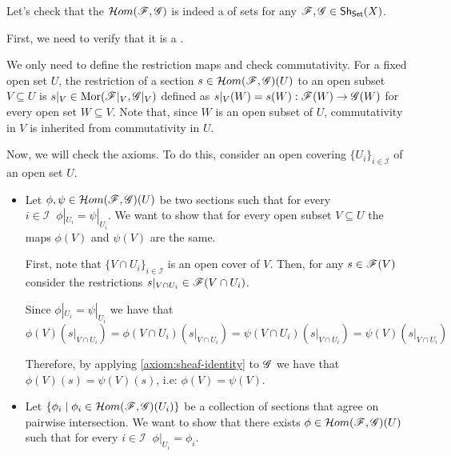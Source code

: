 \documentclass[../main.tex]{subfiles}
\begin{document}
\begin{remark}
  Let's check that the  \(\mathcal{H}om(\mathscr{F}, \mathscr{G})\) is indeed a  of sets for any \(\mathscr{F}, \mathscr{G} \in \mathsf{Sh}_{\mathsf{Set}}(X)\).

  First, we need to verify that it is a .

  We only need to define the restriction maps and check commutativity.
  For a fixed open set \(U\), the restriction of a section \(s \in \mathcal{H}om(\mathscr{F}, \mathscr{G})(U)\) to an open subset \(V \subseteq U\) is \(s|_{V} \in \operatorname{Mor}(\mathscr{F}|_{V}, \mathscr{G}|_{V})\) defined as \(s|_{V}(W) = s(W): \mathscr{F}(W) \to \mathscr{G}(W)\) for every open set \(W \subseteq V\).
  Note that, since \(W\) is an open subset of \(U\), commutativity in \(V\) is inherited from commutativity in \(U\).

  Now, we will check the  axioms. To do this, consider an open covering \(\{U_{i}\}_{i \in \mathcal{I}}\) of an open set \(U\).
  \begin{itemize}
    \item[\ref{axiom:sheaf-identity}] Let \(\phi, \psi \in \mathcal{H}om(\mathscr{F}, \mathscr{G})(U)\) be two sections such that for every \(i \in \mathcal{I} \;\; \phi|_{U_{i}} = \psi|_{U_{i}}\). We want to show that for every open subset \(V \subseteq U\) the maps \(\phi(V)\) and \(\psi(V)\) are the same.

          First, note that \(\{V \cap U_{i}\}_{i \in \mathcal{I}}\) is an open cover of \(V\).
          Then, for any \(s \in \mathscr{F}(V)\) consider the restrictions \(s|_{V \cap U_{i}} \in \mathscr{F}(V \cap U_{i})\).

          Since \(\phi|_{U_{i}} = \psi|_{U_{i}}\) we have that
          \begin{equation*}
            \phi(V)(s|_{V \cap U_{i}}) = \phi(V \cap U_{i})(s|_{V \cap U_{i}}) = \psi(V \cap U_{i})(s|_{V \cap U_{i}}) = \psi(V)(s|_{V \cap U_{i}})
          \end{equation*}

          Therefore, by applying \ref{axiom:sheaf-identity} to \(\mathscr{G}\) we have that \(\phi(V)(s) = \psi(V)(s)\), i.e: \(\phi(V) = \psi(V)\).
    \item[\ref{axiom:sheaf-gluability}] Let \(\{\phi_{i} \mid \phi_{i} \in \mathcal{H}om(\mathscr{F}, \mathscr{G})(U_{i})\}\) be a collection of sections that agree on pairwise intersection. We want to show that there exists \(\phi \in \mathcal{H}om(\mathscr{F}, \mathscr{G})(U)\) such that for every \(i \in \mathcal{I} \;\; \phi|_{U_{i}} = \phi_{i}\).


\end{itemize}
\end{remark}
\end{document}
